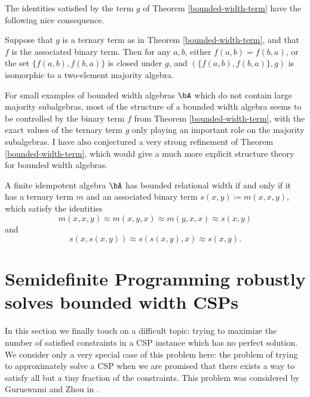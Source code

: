 The identities satisfied by the term $g$ of Theorem \ref{bounded-width-term} have the following nice consequence.

\begin{prop} Suppose that $g$ is a ternary term as in Theorem \ref{bounded-width-term}, and that $f$ is the associated binary term. Then for any $a,b$, either $f(a,b) = f(b,a)$, or the set $\{f(a,b), f(b,a)\}$ is closed under $g$, and $(\{f(a,b),f(b,a)\},g)$ is isomorphic to a two-element majority algebra.
\end{prop}

For small examples of bounded width algebras $\bA$ which do not contain large majority subalgebras, most of the structure of a bounded width algebra seems to be controlled by the binary term $f$ from Theorem \ref{bounded-width-term}, with the exact values of the ternary term $g$ only playing an important role on the majority subalgebras. I have also conjectured a very strong refinement of Theorem \ref{bounded-width-term}, which would give a much more explicit structure theory for bounded width algebras.

\begin{conj} A finite idempotent algebra $\bA$ has bounded relational width if and only if it has a ternary term $m$ and an associated binary term $s(x,y) \coloneqq m(x,x,y)$, which satisfy the identities
\[
m(x,x,y) \approx m(x,y,x) \approx m(y,x,x) \approx s(x,y)
\]
and
\[
s(x,s(x,y)) \approx s(s(x,y),x) \approx s(x,y).
\]
\end{conj}




\section{Semidefinite Programming robustly solves bounded width CSPs}

In this section we finally touch on a difficult topic: trying to maximize the number of satisfied constraints in a CSP instance which has no perfect solution. We consider only a very special case of this problem here: the problem of trying to approximately solve a CSP when we are promised that there exists a way to satisfy all but a tiny fraction of the constraints. This problem was considered by Guruswami and Zhou in \cite{robust-horn-gap}.


